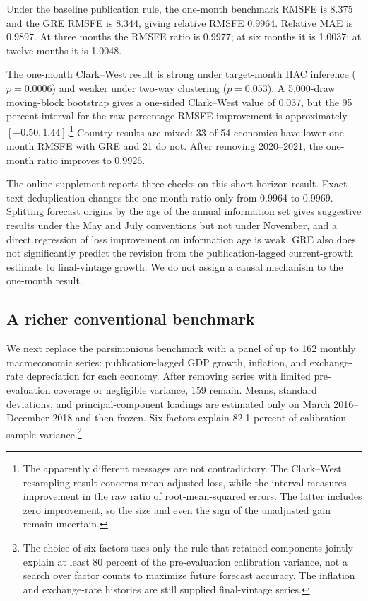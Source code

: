 \documentclass[preprint,12pt,authoryear]{elsarticle}
\begin{document}
Under the baseline publication rule, the one-month benchmark RMSFE is 8.375 and the GRE RMSFE is 8.344, giving relative RMSFE 0.9964. Relative MAE is 0.9897. At three months the RMSFE ratio is 0.9977; at six months it is 1.0037; at twelve months it is 1.0048.



The one-month Clark--West result is strong under target-month HAC inference ($p=0.0006$) and weaker under two-way clustering ($p=0.053$). A 5,000-draw moving-block bootstrap gives a one-sided Clark--West value of 0.037, but the 95 percent interval for the raw percentage RMSFE improvement is approximately $[-0.50,1.44]$.\footnote{The apparently different messages are not contradictory. The Clark--West resampling result concerns mean adjusted loss, while the interval measures improvement in the raw ratio of root-mean-squared errors. The latter includes zero improvement, so the size and even the sign of the unadjusted gain remain uncertain.} Country results are mixed: 33 of 54 economies have lower one-month RMSFE with GRE and 21 do not. After removing 2020--2021, the one-month ratio improves to 0.9926.

The online supplement reports three checks on this short-horizon result. Exact-text deduplication changes the one-month ratio only from 0.9964 to 0.9969. Splitting forecast origins by the age of the annual information set gives suggestive results under the May and July conventions but not under November, and a direct regression of loss improvement on information age is weak. GRE also does not significantly predict the revision from the publication-lagged current-growth estimate to final-vintage growth. We do not assign a causal mechanism to the one-month result.

\subsection{A richer conventional benchmark}

We next replace the parsimonious benchmark with a panel of up to 162 monthly macroeconomic series: publication-lagged GDP growth, inflation, and exchange-rate depreciation for each economy. After removing series with limited pre-evaluation coverage or negligible variance, 159 remain. Means, standard deviations, and principal-component loadings are estimated only on March 2016--December 2018 and then frozen. Six factors explain 82.1 percent of calibration-sample variance.\footnote{The choice of six factors uses only the rule that retained components jointly explain at least 80 percent of the pre-evaluation calibration variance, not a search over factor counts to maximize future forecast accuracy. The inflation and exchange-rate histories are still supplied final-vintage series.}
\end{document}
